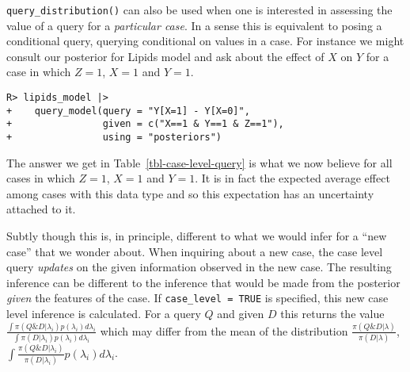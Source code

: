 \documentclass[
  11pt,
  article]{jss}
\begin{document}
\texttt{query\_distribution()} can also be used when one is interested
in assessing the value of a query for a \emph{particular case}. In a
sense this is equivalent to posing a conditional query, querying
conditional on values in a case. For instance we might consult our
posterior for Lipids model and ask about the effect of \(X\) on \(Y\)
for a case in which \(Z=1\), \(X=1\) and \(Y=1\).

\begin{verbatim}
R> lipids_model |>
+    query_model(query = "Y[X=1] - Y[X=0]",
+                given = c("X==1 & Y==1 & Z==1"),
+                using = "posteriors")
\end{verbatim}

\hypertarget{tbl-case-level-query}{}
\begin{table}[!h]
\caption{\label{tbl-case-level-query}Case level query example. }\tabularnewline

\centering
{}
\end{table}

The answer we get in Table~\ref{tbl-case-level-query} is what we now
believe for all cases in which \(Z=1\), \(X=1\) and \(Y=1\). It is in
fact the expected average effect among cases with this data type and so
this expectation has an uncertainty attached to it.

Subtly though this is, in principle, different to what we would infer
for a ``new case'' that we wonder about. When inquiring about a new
case, the case level query \emph{updates} on the given information
observed in the new case. The resulting inference can be different to
the inference that would be made from the posterior \emph{given} the
features of the case. If \texttt{case\_level\ =\ TRUE} is specified,
this new case level inference is calculated. For a query \(Q\) and given
\(D\) this returns the value
\(\frac{\int\pi(Q \& D | \lambda_i)p(\lambda_i)d\lambda_i}{\int\pi(D | \lambda_i)p(\lambda_i)d\lambda_i}\)
which may differ from the mean of the distribution
\(\frac{\pi(Q \& D | \lambda)}{\pi(D | \lambda)}\),
\(\int \frac{\pi(Q \& D | \lambda_i)}{\pi(D | \lambda_i)} p(\lambda_i)d\lambda_i\).
\end{document}
